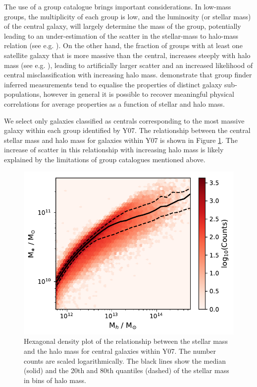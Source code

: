 The use of a group catalogue brings important considerations. In low-mass groups, the multiplicity of each group is low, and the luminosity (or stellar mass) of the central galaxy, will largely determine the mass of the group, potentially leading to an under-estimation of the scatter in the stellar-mass to halo-mass relation (see e.g. \citealt{campbell2015, reddick2013}). On the other hand, the fraction of groups with at least one satellite galaxy that is more massive than the central, increases steeply with halo mass (see e.g. \citealt{reddick2013}), leading to artificially larger scatter and an increased likelihood of central misclassification with increasing halo mass. \citet{campbell2015} demonstrate that group finder inferred measurements tend to equalise the properties of distinct galaxy sub-populations, however in general it is possible to recover meaningful physical correlations for average properties as a function of stellar and halo mass. 

We select only galaxies classified as centrals corresponding to the most massive galaxy within each group identified by Y07. The relationship between the central stellar mass and halo mass for galaxies within Y07 is shown in Figure \ref{fig:stel_halo_dist}. The increase of scatter in this relationship with increasing halo mass is likely explained by the limitations of group catalogues mentioned above. 

\begin{figure}
    \centering
	\includegraphics[width=0.8\linewidth]{thesis/latex/misalignment_MaNGA/stel_halo_ratio_dist.pdf}
    \caption[Hexagonal density plot of the relationship between the stellar mass  and the halo mass for central galaxies within Y07]{Hexagonal density plot of the relationship between the stellar mass  and the halo mass for central galaxies within Y07. The number counts are scaled logarithmically. The black lines show the median (solid) and the 20th and 80th quantiles (dashed) of the stellar mass in bins of halo mass.}
    \label{fig:stel_halo_dist}
\end{figure}

